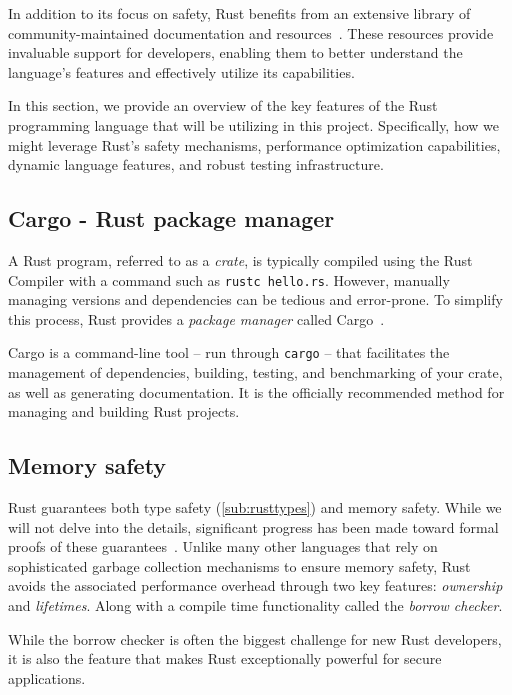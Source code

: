 \documentclass[11pt]{report}
\theoremstyle{definition}
\theoremstyle{plain}
\begin{document}
In addition to its focus on safety, Rust benefits from an extensive library of community-maintained documentation and resources~\cite{rustlangRustProgramming,rustlangPerformanceBook,lurklurkEffectiveRust}. These resources provide invaluable support for developers, enabling them to better understand the language's features and effectively utilize its capabilities.

In this section, we provide an overview of the key features of the Rust programming language that will be utilizing in this project. Specifically, how we might leverage Rust's safety mechanisms, performance optimization capabilities, dynamic language features, and robust testing infrastructure.

\subsection{Cargo - Rust package manager}\label{sec:cargo}
A Rust program, referred to as a \textit{crate}, is typically compiled using the Rust Compiler with a command such as \texttt{rustc hello.rs}. However, manually managing versions and dependencies can be tedious and error-prone. To simplify this process, Rust provides a \textit{package manager} called Cargo~\cite{rustlangCargo}.

Cargo is a command-line tool -- run through \texttt{cargo} -- that facilitates the management of dependencies, building, testing, and benchmarking of your crate, as well as generating documentation. It is the officially recommended method for managing and building Rust projects.


\subsection{Memory safety}\label{sec:rustborrow} %
Rust guarantees both type safety (\autoref{sub:rusttypes}) and memory safety. While we will not delve into the details, significant progress has been made toward formal proofs of these guarantees~\cite{jung2017rustbelt}. Unlike many other languages that rely on sophisticated garbage collection mechanisms to ensure memory safety, Rust avoids the associated performance overhead through two key features: \textit{ownership} and \textit{lifetimes}. Along with a compile time functionality called the \textit{borrow checker}.

While the borrow checker is often the biggest challenge for new Rust developers, it is also the feature that makes Rust exceptionally powerful for secure applications.
\end{document}
